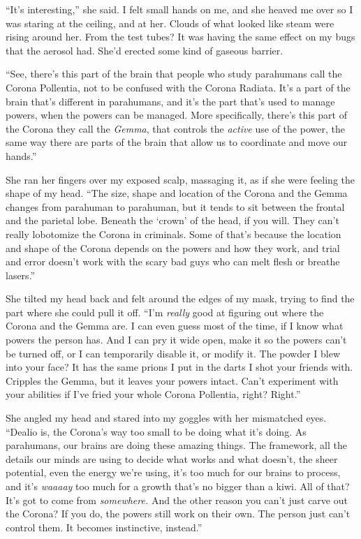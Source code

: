 ``It's interesting,'' she said.  I felt small hands on me, and she heaved me over so I was staring at the ceiling, and at her.  Clouds of what looked like steam were rising around her.  From the test tubes?  It was having the same effect on my bugs that the aerosol had.  She'd erected some kind of gaseous barrier.



``See, there's this part of the brain that people who study parahumans call the Corona Pollentia, not to be confused with the Corona Radiata.  It's a part of the brain that's different in parahumans, and it's the part that's used to manage powers, when the powers can be managed.  More specifically, there's this part of the Corona they call the \emph{Gemma}, that controls the \emph{active }use of the power, the same way there are parts of the brain that allow us to coordinate and move our hands.''



She ran her fingers over my exposed scalp, massaging it, as if she were feeling the shape of my head.  ``The size, shape and location of the Corona and the Gemma changes from parahuman to parahuman, but it tends to sit between the frontal and the parietal lobe.  Beneath the `crown' of the head, if you will.  They can't really lobotomize the Corona in criminals.  Some of that's because the location and shape of the Corona depends on the powers and how they work, and trial and error doesn't work with the scary bad guys who can melt flesh or breathe lasers.''



She tilted my head back and felt around the edges of my mask, trying to find the part where she could pull it off.   ``I'm \emph{really} good at figuring out where the Corona and the Gemma are.  I can even guess most of the time, if I know what powers the person has.  And I can pry it wide open, make it so the powers can't be turned off, or I can temporarily disable it, or modify it.  The powder I blew into your face?  It has the same prions I put in the darts I shot your friends with.  Cripples the Gemma, but it leaves your powers intact.  Can't experiment with your abilities if I've fried your whole Corona Pollentia, right?  Right.''



She angled my head and stared into my goggles with her mismatched eyes.  ``Dealio is, the Corona's way too small to be doing what it's doing.  As parahumans, our brains are doing these amazing things.  The framework, all the details our minds are using to decide what works and what doesn't, the sheer potential, even the energy we're using, it's too much for our brains to process, and it's \emph{waaaay} too much for a growth that's no bigger than a kiwi.  All of that?  It's got to come from \emph{somewhere.  }And the other reason you can't just carve out the Corona?  If you do, the powers still work on their own.  The person just can't control them.  It becomes instinctive, instead.''



